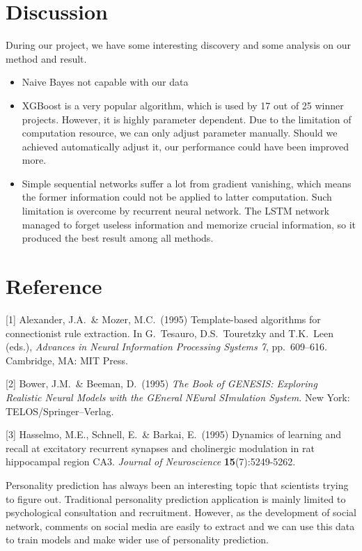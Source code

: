 \documentclass{article}
\begin{document}
\section{Discussion}
During our project, we have some interesting discovery and some analysis on our method and result.
\begin{itemize}
	\item Naive Bayes not capable with our data
	\item XGBoost is a very popular algorithm, which is used by 17 out of 25 winner projects. However, it is highly parameter dependent. Due to the limitation of computation resource, we can only adjust parameter manually. Should we achieved automatically adjust it, our performance could have been improved more.
	\item Simple sequential networks suffer a lot from gradient vanishing, which means the former information could not be applied to latter computation. Such limitation is overcome by recurrent neural network. The LSTM network managed to forget useless information and memorize crucial information, so it produced the best result among all methods.
\end{itemize}




\section{Reference}


\small

[1] Alexander, J.A.\ \& Mozer, M.C.\ (1995) Template-based algorithms for
connectionist rule extraction. In G.\ Tesauro, D.S.\ Touretzky and T.K.\ Leen
(eds.), {\it Advances in Neural Information Processing Systems 7},
pp.\ 609--616. Cambridge, MA: MIT Press.

[2] Bower, J.M.\ \& Beeman, D.\ (1995) {\it The Book of GENESIS: Exploring
  Realistic Neural Models with the GEneral NEural SImulation System.}  New York:
TELOS/Springer--Verlag.

[3] Hasselmo, M.E., Schnell, E.\ \& Barkai, E.\ (1995) Dynamics of learning and
recall at excitatory recurrent synapses and cholinergic modulation in rat
hippocampal region CA3. {\it Journal of Neuroscience} {\bf 15}(7):5249-5262.

 Personality prediction has always been an interesting topic that scientists trying to figure out. Traditional personality prediction application is mainly limited to psychological consultation and recruitment. However, as the development of social network, comments on social media are easily to extract and we can use this data to train models and make wider use of personality prediction.
 
\end{document}
